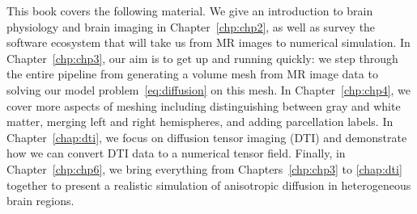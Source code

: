 This book covers the following material. We give an
introduction to brain physiology and brain imaging in
Chapter~\ref{chp:chp2}, as well as survey the software ecosystem
that will take us from MR images to numerical
simulation. In Chapter~\ref{chp:chp3}, our aim is to get up and
running quickly: we step through the entire pipeline from generating a
volume mesh from MR image data to solving our model
problem~\eqref{eq:diffusion} on this mesh. In Chapter~\ref{chp:chp4},
we cover more aspects of meshing including distinguishing between gray and
white matter, merging left and right hemispheres, and adding
parcellation labels. In Chapter~\ref{chap:dti}, we focus on diffusion
tensor imaging (DTI) and demonstrate how we can convert DTI data
to a numerical tensor field. Finally, in Chapter~\ref{chp:chp6}, we
bring everything from Chapters~\ref{chp:chp3} to \ref{chap:dti} together
to present a realistic simulation of anisotropic diffusion in
heterogeneous brain regions. 
 
